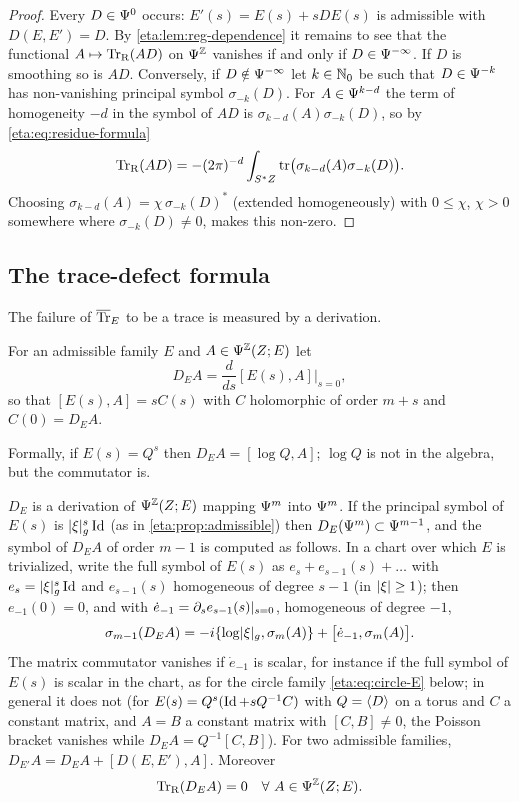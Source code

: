 \begin{proof} Every $D\in\Psi^{0}$ occurs: $E'(s)=E(s)+sDE(s)$ is admissible with
$D(E,E')=D$. By \cref{eta:lem:reg-dependence} it remains to see that the functional
$A\mapsto\operatorname{Tr}_{\mathrm{R}}(AD)$ on $\Psi^{\mathbb{Z}}$ vanishes if and only if $D\in\Psi^{-\infty}$. If
$D$ is smoothing so is $AD$. Conversely, if $D\notin\Psi^{-\infty}$ let $k\in\mathbb{N}_0$
be such that $D\in\Psi^{-k}$ has non-vanishing principal symbol $\sigma_{-k}(D)$. For
$A\in\Psi^{k-d}$ the term of homogeneity $-d$ in the symbol of $AD$ is
$\sigma_{k-d}(A)\sigma_{-k}(D)$, so by \eqref{eta:eq:residue-formula}
\[
\operatorname{Tr}_{\mathrm{R}}(AD)=-(2\pi)^{-d}\int_{S^*Z}\operatorname{tr}\bigl(\sigma_{k-d}(A)\sigma_{-k}(D)\bigr).
\]
Choosing $\sigma_{k-d}(A)=\chi\,\sigma_{-k}(D)^*$ (extended homogeneously) with
$0\le\chi$, $\chi>0$ somewhere where $\sigma_{-k}(D)\ne0$, makes this non-zero.
\end{proof}

\subsection{The trace-defect formula} The failure of $\overline{\operatorname{Tr}}_E$ to be a trace is
measured by a derivation.

\begin{definition}\label{eta:def:derivation}
For an admissible family $E$ and $A\in\Psi^{\mathbb{Z}}(Z;E)$ let
\[
D_EA=\frac{d}{ds}[E(s),A]\Big|_{s=0},
\]
so that $[E(s),A]=sC(s)$ with $C$ holomorphic of order $m+s$ and $C(0)=D_EA$.
\end{definition}

Formally, if $E(s)=Q^s$ then $D_EA=[\log Q,A]$; $\log Q$ is not in the algebra, but
the commutator is.

\begin{proposition}\label{eta:prop:derivation}
$D_E$ is a derivation of $\Psi^{\mathbb{Z}}(Z;E)$ mapping $\Psi^{m}$ into $\Psi^{m}$. If the
principal symbol of $E(s)$ is $\lvert \xi\rvert_g^s\operatorname{Id}$ (as in \cref{eta:prop:admissible}) then
$D_E(\Psi^{m})\subset\Psi^{m-1}$, and the symbol of $D_EA$ of order $m-1$ is computed
as follows. In a chart over which $E$ is trivialized, write the full symbol of $E(s)$
as $e_s+e_{s-1}(s)+\dots$ with $e_s=\lvert \xi\rvert_g^s\operatorname{Id}$ and $e_{s-1}(s)$ homogeneous of
degree $s-1$ (in $\lvert \xi\rvert\ge1$); then $e_{-1}(0)=0$, and with
$\dot e_{-1}=\partial_se_{s-1}(s)|_{s=0}$, homogeneous of degree $-1$,
\begin{equation}\label{eta:eq:DE-symbol}
\sigma_{m-1}(D_EA)=-i\{\log\lvert \xi\rvert_g,\sigma_m(A)\}+\bigl[\dot e_{-1},\sigma_m(A)\bigr].
\end{equation}
The matrix commutator vanishes if $\dot e_{-1}$ is scalar, for instance if the full
symbol of $E(s)$ is scalar in the chart, as for the circle family
\eqref{eta:eq:circle-E} below; in general it does not (for $E(s)=Q^s(\operatorname{Id}+sQ^{-1}C)$
with $Q=\langle D\rangle$ on a torus and $C$ a constant matrix, and $A=B$ a constant matrix
with $[C,B]\ne0$, the Poisson bracket vanishes while $D_EA=Q^{-1}[C,B]$). For two
admissible families, $D_{E'}A=D_EA+[D(E,E'),A]$. Moreover
\[
\TrR(D_EA)=0\quad\forall\ A\in\Psido{\Z}(Z;E).
\]
\end{proposition}

